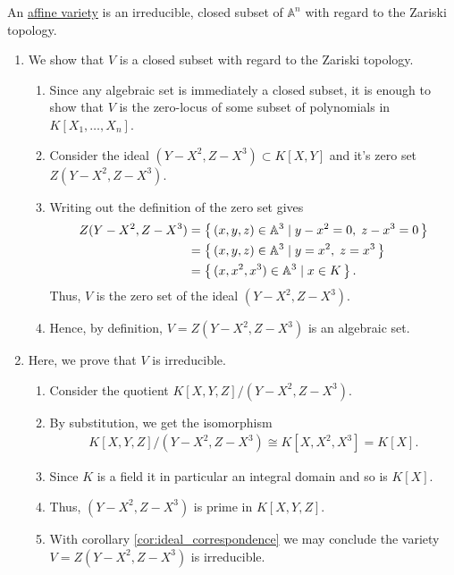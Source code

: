 \begin{solution}
    An \hyperref[def:algebraic_variety]{affine variety} is an irreducible, closed subset of \(\mathbb{A}^n\) with regard to the Zariski topology.
    \begin{enumerate}
        \item We show that \(V\) is a closed subset with regard to the Zariski topology.
        \begin{enumerate}
            \item Since any algebraic set is immediately a closed subset, it is enough to show that \(V\) is the zero-locus of some subset of polynomials in \(K[X_1, \ldots, X_n]\).
            \item Consider the ideal \((Y - X^2, Z - X^3) \subset K[X, Y]\) and it's zero set \(Z(Y - X^2, Z - X^3)\).
            \item Writing out the definition of the zero set gives
            \begin{align*}
                Z(Y - X^2, Z - X^3) &= \left\{\, (x, y, z) \in \mathbb{A}^3 \mathrel{\mid} y - x^2 = 0, \; z - x^3 = 0 \,\right\} \\
                &= \left\{\, (x, y, z) \in \mathbb{A}^3 \mathrel{\mid} y = x^2, \; z = x^3 \,\right\} \\
                &= \left\{\, (x, x^2, x^3) \in \mathbb{A}^3 \mathrel{\mid} x \in K \,\right\} \text{.}
            \end{align*}
            Thus, \(V\) is the zero set of the ideal \((Y - X^2, Z - X^3)\).
            \item Hence, by definition, \(V = Z(Y - X^2, Z - X^3)\) is an algebraic set.
        \end{enumerate}
        \item Here, we prove that \(V\) is irreducible.
        \begin{enumerate}
            \item Consider the quotient \(K[X, Y, Z] / (Y - X^2, Z - X^3)\).
            \item By substitution, we get the isomorphism
            \begin{align*}
                K[X, Y, Z] / (Y - X^2, Z - X^3) \cong K[X, X^2, X^3] = K[X] \text{.}
            \end{align*}
            \item Since \(K\) is a field it in particular an integral domain and so is \(K[X]\).
            \item Thus, \((Y - X^2, Z - X^3)\) is prime in \(K[X, Y, Z]\).
            \item With corollary \ref{cor:ideal_correspondence} we may conclude the variety \(V = Z(Y - X^2, Z - X^3)\) is irreducible.

\end{enumerate}
\end{enumerate}
\end{solution}
